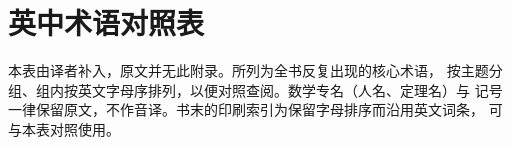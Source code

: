 
\appendix
\section{英中术语对照表}
\label{app:glossary}

\noindent 本表由译者补入，原文并无此附录。所列为全书反复出现的核心术语，
按主题分组、组内按英文字母序排列，以便对照查阅。数学专名（人名、定理名）与
记号一律保留原文，不作音译。书末的印刷索引为保留字母排序而沿用英文词条，
可与本表对照使用。

